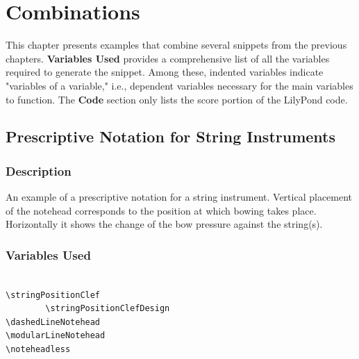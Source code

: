 
\chapter{Combinations}\label{ch:combinations}

This chapter presents examples that combine several snippets from the previous chapters. \textbf{Variables Used} provides a comprehensive list of all the variables required to generate the snippet. Among these, indented variables indicate "variables of a variable," i.e., dependent variables necessary for the main variables to function. The \textbf{Code} section only lists the score portion of the LilyPond code.

\section {Prescriptive Notation for String Instruments}
\label{sec:comb_strings}
\hfill
{}
\hfill

\subsection{Description}
An example of a prescriptive notation for a string instrument. Vertical placement of the notehead corresponds to the position at which bowing takes place. Horizontally it shows the change of the bow pressure against the string(s).
\subsection{Variables Used}
\begin{verbatim}

\stringPositionClef
		\stringPositionClefDesign
\dashedLineNotehead
\modularLineNotehead
\noteheadless
\end{verbatim}
